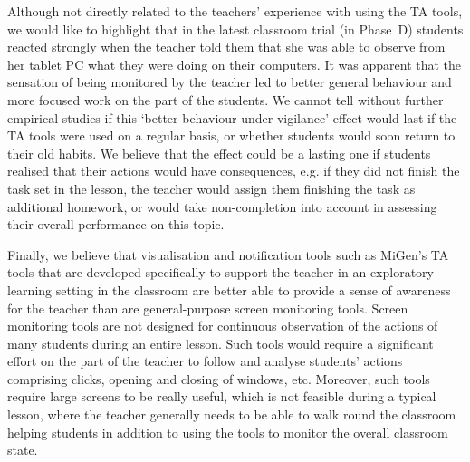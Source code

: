 Although not directly related to the teachers' experience with using the TA
tools, we would like to highlight that in the latest classroom trial 
(in Phase~D) students reacted strongly when the teacher 
told them that she was able to observe from her tablet PC what they were 
doing on their computers. %
It was apparent that the sensation of being monitored by the teacher 
led to better general behaviour and more focused work on the part of 
the students. 
We cannot tell without further empirical studies if this 
`better behaviour under vigilance' effect 
would last if the TA tools were used on a regular basis, or whether
students would soon return to their old habits. 
We believe that the effect could be a lasting one if students realised that their
actions would have consequences, e.g. if they did not finish
the task set in the lesson, the teacher would assign them finishing the task
as additional homework, or would take non-completion into account in assessing
their overall performance on this topic. 

Finally, we believe that visualisation and notification tools such as MiGen's TA tools 
that are developed specifically to support the teacher in an exploratory learning setting 
in the classroom are better able to provide a sense of awareness for the teacher 
than are general-purpose screen monitoring tools.
Screen monitoring tools are not designed for continuous observation 
of the actions of many students during an entire lesson. 
Such tools would require a significant effort
on the part of the teacher to follow and analyse students' actions
comprising clicks, opening and closing of windows, etc. Moreover, such
tools require large screens to be really useful, which is not feasible
during a typical lesson, where the teacher generally needs to be able
to walk round the classroom helping students in addition to using the
tools to monitor the overall classroom state. 
